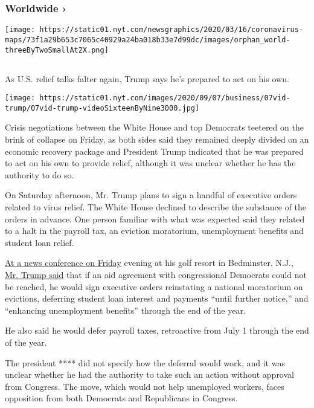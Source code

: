 \hypertarget{worldwide-}{%
\subsubsection{Worldwide ›}\label{worldwide-}}

\texttt{[image: https://static01.nyt.com/newsgraphics/2020/03/16/coronavirus-maps/73f1a29b653c7065c40929a24ba018b33e7d99dc/images/orphan\_world-threeByTwoSmallAt2X.png]}

\hypertarget{section-1}{%
\subsection{}\label{section-1}}

As U.S. relief talks falter again, Trump says he's prepared to act on
his own.

\texttt{[image: https://static01.nyt.com/images/2020/09/07/business/07vid-trump/07vid-trump-videoSixteenByNine3000.jpg]}

Crisis negotiations between the White House and top Democrats teetered
on the brink of collapse on Friday, as both sides said they remained
deeply divided on an economic recovery package and President Trump
indicated that he was prepared to act on his own to provide relief,
although it was unclear whether he has the authority to do so.

On Saturday afternoon, Mr. Trump plans to sign a handful of executive
orders related to virus relief. The White House declined to describe the
substance of the orders in advance. One person familiar with what was
expected said they related to a halt in the payroll tax, an eviction
moratorium, unemployment benefits and student loan relief.

\href{https://www.nytimes.com/2020/08/07/us/politics/trump-news-conference-bedminster.html}{At
a news conference on Friday} evening at his golf resort in Bedminster,
N.J.,
\href{https://www.nytimes.com/video/us/politics/100000007279339/trump-says-he-will-act-on-his-own-if-congress-doesnt-agree-on-relief.html}{Mr.
Trump said} that if an aid agreement with congressional Democrats could
not be reached, he would sign executive orders reinstating a national
moratorium on evictions, deferring student loan interest and payments
``until further notice,'' and ``enhancing unemployment benefits''
through the end of the year.

He also said he would defer payroll taxes, retroactive from July 1
through the end of the year.

The president **** did not specify how the deferral would work, and it
was unclear whether he had the authority to take such an action without
approval from Congress. The move, which would not help unemployed
workers, faces opposition from both Democrats and Republicans in
Congress.


